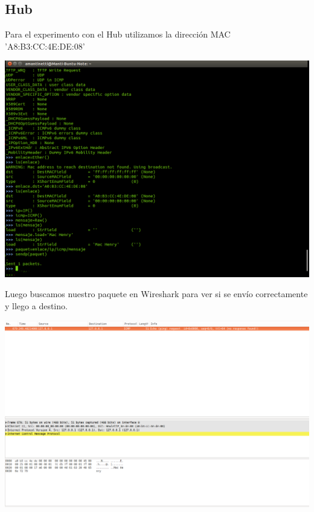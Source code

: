 \documentclass[spanish]{udpreport}
\begin{document}
\pagebreak

\subsection{Hub}

Para el experimento con el Hub utilizamos la dirección MAC 'A8:B3:CC:4E:DE:08'

\begin{center}
	\includegraphics[scale=.27]{imagenes/Hub/sendmanti.png}
	\\
\end{center}

Luego buscamos nuestro paquete en Wireshark para ver si se envío correctamente y llego a destino.\\

\begin{center}
	\includegraphics[scale=.27]{imagenes/Hub/ipmanti.png}
\end{center}
\end{document}
